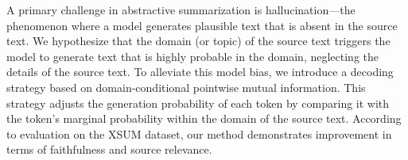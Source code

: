 A primary challenge in abstractive summarization is hallucination---the phenomenon where a model generates plausible text that is absent in the source text. We hypothesize that the domain (or topic) of the source text triggers the model to generate text that is highly probable in the domain, neglecting the details of the source text. To alleviate this model bias, we introduce a decoding strategy based on domain-conditional pointwise mutual information.  This strategy adjusts the generation probability of each token by comparing it with the token's marginal probability within the domain of the source text. According to evaluation on the XSUM dataset, our method demonstrates improvement in terms of faithfulness and source relevance.